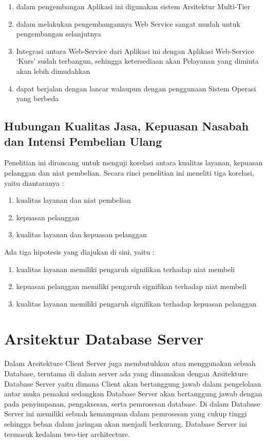 \begin{enumerate}
    \item dalam pengembangan Aplikasi ini digunakan sistem Arsitektur Multi-Tier
    \item dalam melakukan pengembangannya Web Service sangat mudah untuk pengembangan selanjutnya
    \item Integrasi antara Web-Service dari Aplikasi ini dengan Aplikasi Web-Service `Kurs' sudah terbangun, sehingga ketersediaan akan Pelayanan yang diminta akan lebih dimudahkan
    \item dapat berjalan dengan lancar walaupun dengan penggunaan Sistem Operasi yang berbeda
\end{enumerate}

\subsection {Hubungan Kualitas Jasa, Kepuasan Nasabah dan Intensi Pembelian Ulang}
Penelitian ini dirancang untuk menguji korelasi antara kualitas layanan, kepuasan pelanggan dan niat pembelian. Secara rinci penelitian 
ini meneliti tiga korelasi, yaitu diantaranya :

\begin{enumerate}
\item kualitas layanan dan niat pembelian  
\item kepuasan pelanggan
\item kualitas layanan dan kepuasan pelanggan
\end{enumerate}

Ada tiga hipotesis yang diajukan di sini, yaitu :
\begin{enumerate}
\item kualitas layanan memiliki pengaruh signifikan terhadap niat membeli 
\item kepuasan pelanggan memiliki pengaruh signifikan terhadap niat membeli
\item kualitas layanan memiliki pengaruh signifikan terhadap kepuasan pelanggan 
\end{enumerate}

\section{Arsitektur Database Server}
Dalam Arsitekture Client Server juga membutuhkan atau menggunakan sebuah Database, terutama di dalam server ada yang
dinamakan dengan Arsitekture Database Server yaitu dimana Client akan bertanggung jawab dalam pengelolaan antar muka pemakai
sedangkan Database Server akan bertanggung jawab dengan pada penyimpanan, pengaksesan, serta pemrosesan database.
Di dalam Database Server ini memiliki sebuah kemampuan dalam pemrosesan yang cukup tinggi sehingga beban dalam jaringan akan 
menjadi berkurang. Database Server ini termasuk kedalam two-tier architecture.

